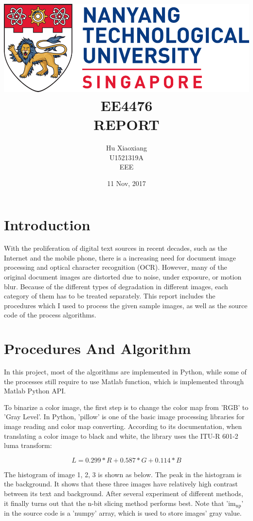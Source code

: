 \documentclass[titlepage]{article}
\author{Hu Xiaoxiang \\
U1521319A \\
EEE \\
}
\date{11 Nov, 2017 \\
}
\title{\includegraphics[width=\textwidth]{logo_ntu_new.png} \\
[5\baselineskip] EE4476 \\
REPORT \\
[5\baselineskip]}
\begin{document}
\maketitle
\tableofcontents

\newpage
{}

\section{Introduction}
\label{sec:org1e6f45b}
With the proliferation of digital text sources in recent decades, such as the
Internet and the mobile phone, there is a increasing need for document image
processing and optical character recognition (OCR). However, many of the
original document images are distorted due to noise, under exposure, or motion
blur. Because of the different types of degradation in different images, each
category of them has to be treated separately. This report includes the
procedures which I used to process the given sample images, as well as the
source code of the process algorithms.

\section{Procedures And Algorithm}
\label{sec:org2b46001}
In this project, most of the algorithms are implemented in Python, while some
of the processes still require to use Matlab function, which is implemented
through Matlab Python API. 

To binarize a color image, the first step is to change the color map from
'RGB' to 'Gray Level'. In Python, 'pillow' is one of the basic image
processing libraries for image reading and color map converting. According to
its documentation, when translating a color image to black and white, the
library uses the ITU-R 601-2 luma transform:

$$ L = 0.299 * R + 0.587 * G + 0.114 * B $$

The histogram of image 1, 2, 3 is shown as below. The peak in the histogram is
the background. It shows that these three images have relatively high contrast
between its text and background. After several experiment of different
methods, it finally turns out that the n-bit slicing method performs best.
Note that 'im\(_{\text{np}}\)' in the source code is a 'numpy' array, which is used to
store images' gray value.
\end{document}
